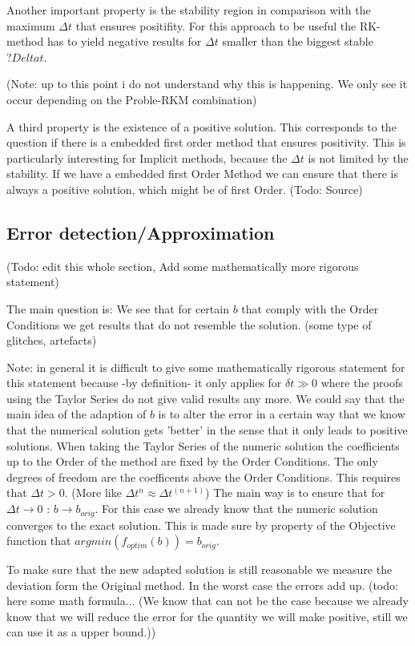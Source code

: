 \documentclass{article}
\begin{document}
Another important property is the stability region in comparison with the maximum $\Delta t$ that ensures positifity. For this approach to be useful the RK-method has to yield negative results for $\Delta t$ smaller than the biggest stable $?Delta t$.

(Note: up to this point i do not understand why this is happening. We only see it occur depending on the Proble-RKM combination)

A third property is the existence of a positive solution. This corresponds to the question if there is a embedded first order method that ensures positivity. This is particularly interesting for Implicit methods, because the $\Delta t$ is not limited by the stability. 
If we have a embedded first Order Method we can ensure that there is always a positive solution, which might be of first Order. (Todo: Source)

\subsection{Error detection/Approximation}
(Todo: edit this whole section, Add some mathematically more rigorous statement)

The main question is: We see that for certain $b$ that comply with the Order Conditions we get results that do not resemble the solution. (some type of glitches, artefacts)

Note: in general it is difficult to give some mathematically rigorous statement for this statement because -by definition- it only applies for $\delta t \gg 0$ where the proofs using the Taylor Series do not give valid results any more. We could say that the main idea of the adaption of $b$ is to alter the error in a certain way that we know that the numerical solution gets 'better' in the sense that it only leads to positive solutions. 
When taking the Taylor Series of the numeric solution the coefficients up to the Order of the method are fixed by the Order Conditions. The only degrees of freedom are the coefficents above the Order Conditions. This requires that $\Delta t > 0$. (More like $\Delta t^n \approx \Delta t^(n+1) $)
The main way is to ensure that for $\Delta t \to 0$ : $b \to b_{orig}$. For this case we already know that the numeric solution converges to the exact solution.  
This is made sure by property of the Objective function that $argmin(f_{optim}(b)) = b_{orig}$. 

To make sure that the new adapted solution is still reasonable we measure the deviation form the Original method. In the worst case the errors add up. (todo: here some math formula... (We know that can not be the case because we already know that we will reduce the error for the quantity we will make positive, still we can use it as a upper bound.))
\end{document}
